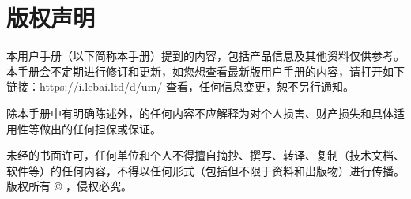 \chapter*{版权声明}
\thispagestyle{empty}
{

本用户手册（以下简称本手册）提到的内容，包括产品信息及其他资料仅供参考。本手册会不定期进行修订和更新，如您想查看最新版用户手册的内容，请打开如下链接：\url{https://i.lebai.ltd/d/um/} 查看{\eBook}，任何信息变更，恕不另行通知。

除本手册中有明确陈述外，{\ThisBook}的任何内容不应解释为{\Company}对个人损害、财产损失和具体适用性等做出的任何担保或保证。

未经{\Company}的书面许可，任何单位和个人不得擅自摘抄、撰写、转译、复制{\ThisBook}（技术文档、软件等）的任何内容，不得以任何形式（包括但不限于资料和出版物）进行传播。\\

版权所有 © {\Company}，侵权必究。
}